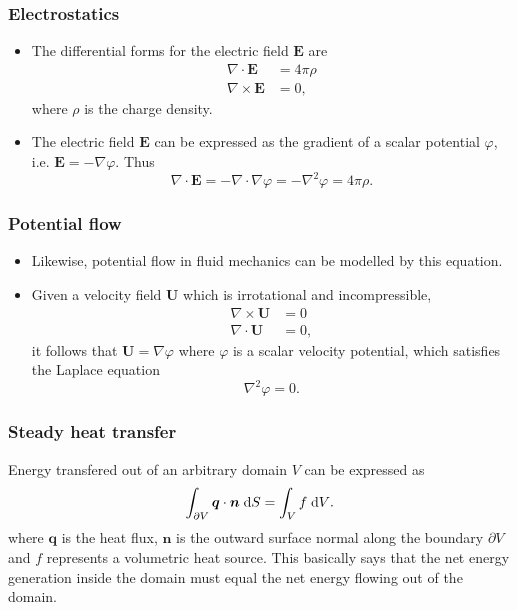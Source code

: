 \begin{frame}[fragile]
  \frametitle{Electrostatics}
  \begin{itemize}
  \item The differential forms for the electric field $\bm E$ are
    \[
      \begin{split}
        \nabla \cdot \bm E &= 4\pi\rho \\
        \nabla \times \bm E &= 0,
      \end{split}
    \]
    where $\rho$ is the charge density.
  \item The electric field $\bm E$ can be expressed as the gradient of
    a scalar potential $\varphi$, i.e. $\bm E = -\nabla\varphi$. Thus
    \[
      \nabla \cdot \bm E = -\nabla\cdot\nabla\varphi = -\nabla^2\varphi = 4\pi\rho.
    \]
  \end{itemize}
\end{frame}

\begin{frame}
  \frametitle{Potential flow}
  \begin{itemize}
  \item Likewise, potential flow in fluid mechanics can be modelled by this
    equation.
  \item Given a velocity field $\bm U$ which is irrotational and incompressible,
    \[
      \begin{split}
        \nabla \times \bm U &= 0 \\
        \nabla \cdot \bm U &= 0,
      \end{split}
    \]
    it follows that $\bm U = \nabla\varphi$ where $\varphi$ is a scalar velocity
    potential, which satisfies the Laplace equation
    \[
      \nabla^2\varphi = 0.
    \]
  \end{itemize}
\end{frame}

\begin{frame}[fragile]
  \frametitle{Steady heat transfer}
  Energy transfered out of an arbitrary domain $V$ can be expressed as
  \[
    \int_{\partial V} \bm q \cdot \bm n {\;\text{d}S} = \int_V f {\;\text{d}V}.
  \]
  where $\bm q$ is the heat flux, $\bm n$ is the outward surface normal along
  the boundary $\partial V$ and $f$ represents a volumetric heat source. This
  basically says that the net energy generation inside the domain must equal the
  net energy flowing out of the domain.
  \begin{center}
    
  \end{center}
\end{frame}


